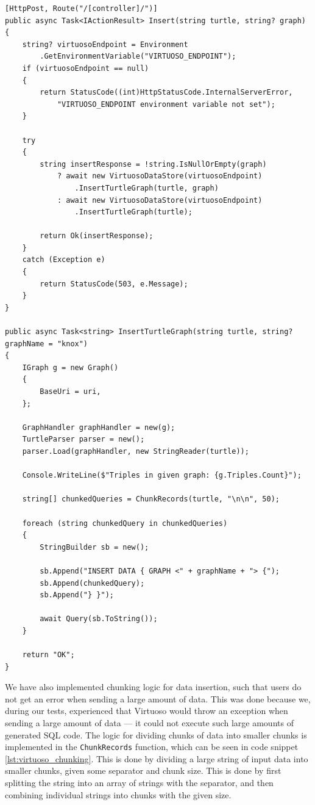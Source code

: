 \begin{lstlisting}[language=CSharp, caption={Data insertion endpoint and data insertion logic}, label={lst:virtuoso_data_insertion}]
[HttpPost, Route("/[controller]/")]
public async Task<IActionResult> Insert(string turtle, string? graph)
{
    string? virtuosoEndpoint = Environment
        .GetEnvironmentVariable("VIRTUOSO_ENDPOINT");
    if (virtuosoEndpoint == null)
    {
        return StatusCode((int)HttpStatusCode.InternalServerError, 
            "VIRTUOSO_ENDPOINT environment variable not set");
    }

    try
    {
        string insertResponse = !string.IsNullOrEmpty(graph) 
            ? await new VirtuosoDataStore(virtuosoEndpoint)
                .InsertTurtleGraph(turtle, graph) 
            : await new VirtuosoDataStore(virtuosoEndpoint)
                .InsertTurtleGraph(turtle);

        return Ok(insertResponse);
    }
    catch (Exception e)
    {
        return StatusCode(503, e.Message);
    }
}

public async Task<string> InsertTurtleGraph(string turtle, string? graphName = "knox")
{
    IGraph g = new Graph()
    {
        BaseUri = uri,
    };
    
    GraphHandler graphHandler = new(g);
    TurtleParser parser = new();
    parser.Load(graphHandler, new StringReader(turtle));
    
    Console.WriteLine($"Triples in given graph: {g.Triples.Count}");

    string[] chunkedQueries = ChunkRecords(turtle, "\n\n", 50);

    foreach (string chunkedQuery in chunkedQueries)
    {
        StringBuilder sb = new();
        
        sb.Append("INSERT DATA { GRAPH <" + graphName + "> {");
        sb.Append(chunkedQuery);
        sb.Append("} }");

        await Query(sb.ToString());
    }

    return "OK";
}
\end{lstlisting}


We have also implemented chunking logic for data insertion, such that users do not get an error when sending a large amount of data. This was done because we, during our tests, experienced that Virtuoso would throw an exception when sending a large amount of data --- it could not execute such large amounts of generated SQL code. The logic for dividing chunks of data into smaller chunks is implemented in the \texttt{ChunkRecords} function, which can be seen in code snippet \ref{lst:virtuoso_chunking}. This is done by dividing a large string of input data into smaller chunks, given some separator and chunk size. This is done by first splitting the string into an array of strings with the separator, and then combining individual strings into chunks with the given size.

